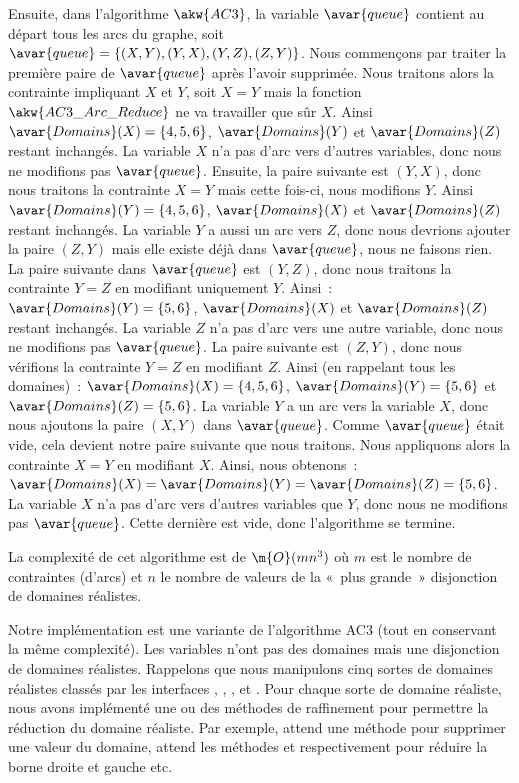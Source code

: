 \begin{example}
\begin{itemize}
\end{itemize}
%
Ensuite, dans l'algorithme $\akw{AC3}$, la variable $\avar{queue}$ contient au
départ tous les arcs du graphe, soit $\avar{queue} = \{(X, Y), (Y, X), (Y, Z),
(Z, Y)\}$. Nous commençons par traiter la première paire de $\avar{queue}$ après
l'avoir supprimée. Nous traitons alors la contrainte impliquant $X$ et $Y$, soit
$X = Y$ mais la fonction $\akw{AC3\_Arc\_Reduce}$ ne va travailler que sûr $X$.
Ainsi $\avar{Domains}(X) = \{4, 5, 6\}$, $\avar{Domains}(Y)$ et
$\avar{Domains}(Z)$ restant inchangés. La variable $X$ n'a pas d'arc vers
d'autres variables, donc nous ne modifions pas $\avar{queue}$. Ensuite, la paire
suivante est $(Y, X)$, donc nous traitons la contrainte $X = Y$ mais cette
fois-ci, nous modifions $Y$. Ainsi $\avar{Domains}(Y) = \{4, 5, 6\}$,
$\avar{Domains}(X)$ et $\avar{Domains}(Z)$ restant inchangés. La variable $Y$ a
aussi un arc vers $Z$, donc nous devrions ajouter la paire $(Z, Y)$ mais elle
existe déjà dans $\avar{queue}$, nous ne faisons rien.  La paire suivante dans
$\avar{queue}$ est $(Y, Z)$, donc nous traitons la contrainte $Y = Z$ en
modifiant uniquement $Y$. Ainsi~: $\avar{Domains}(Y) = \{5, 6\}$,
$\avar{Domains}(X)$ et $\avar{Domains}(Z)$ restant inchangés. La variable $Z$
n'a pas d'arc vers une autre variable, donc nous ne modifions pas
$\avar{queue}$. La paire suivante est $(Z, Y)$, donc nous vérifions la
contrainte $Y = Z$ en modifiant $Z$. Ainsi (en rappelant tous les domaines)~:
$\avar{Domains}(X) = \{4, 5, 6\}$, $\avar{Domains}(Y) = \{5, 6\}$ et
$\avar{Domains}(Z) = \{5, 6\}$. La variable $Y$ a un arc vers la variable $X$,
donc nous ajoutons la paire $(X, Y)$ dans $\avar{queue}$.  Comme $\avar{queue}$
était vide, cela devient notre paire suivante que nous traitons. Nous appliquons
alors la contrainte $X = Y$ en modifiant $X$.  Ainsi, nous obtenons~:
$\avar{Domains}(X) = \avar{Domains}(Y) = \avar{Domains}(Z) = \{5, 6\}$. La
variable $X$ n'a pas d'arc vers d'autres variables que $Y$, donc nous ne
modifions pas $\avar{queue}$. Cette dernière est vide, donc l'algorithme se
termine.

\end{example}

La complexité de cet algorithme est de $\m{O}(mn^3)$ où $m$ est le nombre de
contraintes (d'arcs) et $n$ le nombre de valeurs de la «~plus grande~»
disjonction de domaines réalistes.

Notre implémentation est une variante de l'algorithme AC3 (tout en conservant la
même complexité). Les variables n'ont pas des domaines mais une disjonction de
domaines réalistes. Rappelons que nous manipulons cinq sortes de domaines
réalistes classés par les interfaces , ,
,  et . Pour chaque sorte de
domaine réaliste, nous avons implémenté une ou des méthodes de raffinement pour
permettre la réduction du domaine réaliste. Par exemple,  attend
une méthode  pour supprimer une valeur du domaine,
 attend les méthodes  et 
respectivement pour réduire la borne droite et gauche etc.

